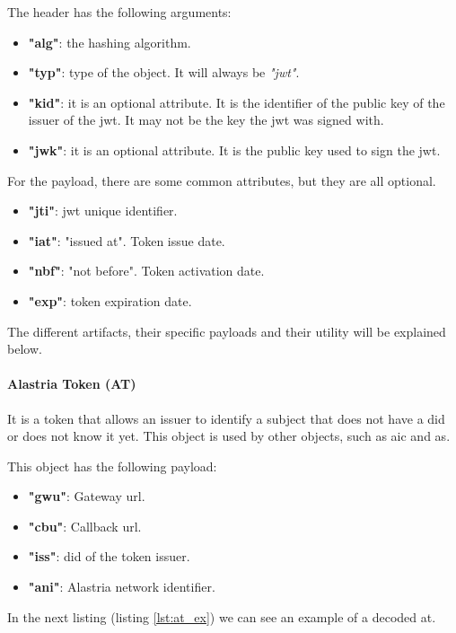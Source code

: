 \documentclass[a4paper, 12pt]{article} %
\begin{document}
            The header has the following arguments:
            \begin{itemize}
                \item \textbf{"alg"}: the hashing algorithm.
                \item \textbf{"typ"}: type of the object. It will always be \textit{"\acrshort{jwt}"}.
                \item \textbf{"kid"}: it is an optional attribute. It is the identifier of the public key of the issuer of the \acrshort{jwt}. It may not be the key the \acrshort{jwt} was signed with.
                \item \textbf{"jwk"}: it is an optional attribute. It is the public key used to sign the \acrshort{jwt}.
            \end{itemize}
            For the payload, there are some common attributes, but they are all optional.
            \begin{itemize}
                \item \textbf{"jti"}: \acrshort{jwt} unique identifier.
                \item \textbf{"iat"}: "issued at". Token issue date.
                \item \textbf{"nbf"}: "not before". Token activation date.
                \item \textbf{"exp"}: token expiration date.
            \end{itemize}
            The different artifacts, their specific payloads and their utility will be explained below.

            \paragraph{Alastria Token (AT)}
                It is a token that allows an issuer to identify a subject that does not have a \acrshort{did} or does not know it yet. This object is used by other objects, such as \acrfull{aic} and \acrfull{as}.
                
                This object has the following payload:
                \begin{itemize}
                    \item \textbf{"gwu"}: Gateway \acrshort{url}.
                    \item \textbf{"cbu"}: Callback \acrshort{url}.
                    \item \textbf{"iss"}: \acrshort{did} of the token issuer.
                    \item \textbf{"ani"}: Alastria network identifier.
                \end{itemize}
                In the next listing (listing \ref{lst:at_ex}) we can see an example of a decoded \acrlong{at}.
                
\end{document}
